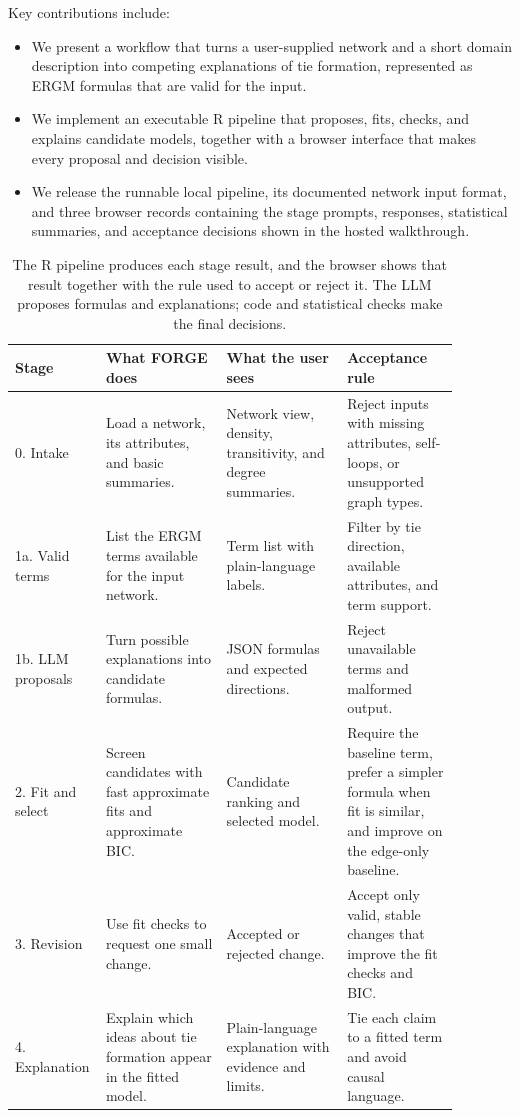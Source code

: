 \documentclass[11pt]{article}
\begin{document}
Key contributions include:
\begin{itemize}
\item We present a workflow that turns a user-supplied network and a short domain description into competing explanations of tie formation, represented as ERGM formulas that are valid for the input.
\item We implement an executable R pipeline that proposes, fits, checks, and explains candidate models, together with a browser interface that makes every proposal and decision visible.
\item We release the runnable local pipeline, its documented network input format, and three browser records containing the stage prompts, responses, statistical summaries, and acceptance decisions shown in the hosted walkthrough.
\end{itemize}


\begin{table}[t]
\centering
\small
\begin{tabular}{@{}p{0.12\linewidth}p{0.26\linewidth}p{0.26\linewidth}p{0.24\linewidth}@{}}
\toprule
Stage & What FORGE does & What the user sees & Acceptance rule \\
\midrule
0. Intake & Load a network, its attributes, and basic summaries. & Network view, density, transitivity, and degree summaries. & Reject inputs with missing attributes, self-loops, or unsupported graph types. \\
1a. Valid terms & List the ERGM terms available for the input network. & Term list with plain-language labels. & Filter by tie direction, available attributes, and term support. \\
1b. LLM proposals & Turn possible explanations into candidate formulas. & JSON formulas and expected directions. & Reject unavailable terms and malformed output. \\
2. Fit and select & Screen candidates with fast approximate fits and approximate BIC. & Candidate ranking and selected model. & Require the baseline term, prefer a simpler formula when fit is similar, and improve on the edge-only baseline. \\
3. Revision & Use fit checks to request one small change. & Accepted or rejected change. & Accept only valid, stable changes that improve the fit checks and BIC. \\
4. Explanation & Explain which ideas about tie formation appear in the fitted model. & Plain-language explanation with evidence and limits. & Tie each claim to a fitted term and avoid causal language. \\
\bottomrule
\end{tabular}
\caption{The R pipeline produces each stage result, and the browser shows that result together with the rule used to accept or reject it. The LLM proposes formulas and explanations; code and statistical checks make the final decisions.}
\label{tab:stages}
\end{table}
\end{document}
